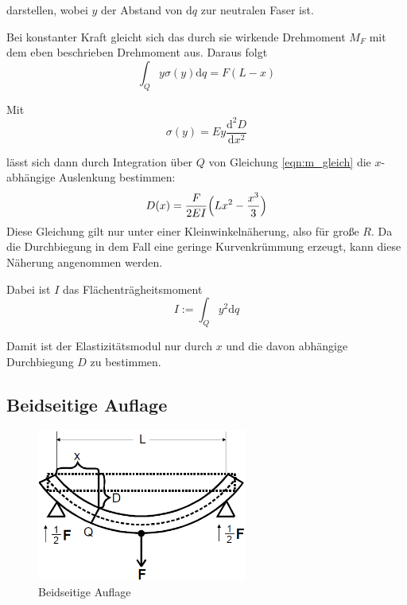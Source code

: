 darstellen, wobei $y$ der Abstand von $\text{d}q$ zur neutralen Faser ist.

Bei konstanter Kraft gleicht sich das durch sie wirkende Drehmoment $M_F$ mit dem eben beschrieben Drehmoment aus. Daraus folgt \begin{equation}
    \label{eqn:m_gleich}
    \int_Q y\sigma(y)\text{d}q = F (L - x) 
\end{equation}

Mit \begin{equation}
    \sigma (y) = E y \frac{\text{d}^2 D}{\text{d} x^2}
\end{equation}

lässt sich dann durch Integration über $Q$ von Gleichung \eqref{eqn:m_gleich} die $x$- abhängige Auslenkung bestimmen:
\begin{equation}
    D(x) = \frac{F}{2EI} \Bigl( L x^2 - \frac{x^3}3 \Bigr)
    \label{eqn:D1_gleich}
\end{equation}
Diese Gleichung gilt nur unter einer Kleinwinkelnäherung, also  für große $R$. Da die Durchbiegung 
in dem Fall eine geringe Kurvenkrümmung erzeugt, kann diese Näherung angenommen werden.

Dabei ist $I$ das Flächenträgheitsmoment \begin{equation}
    I := \int_Q y^2 \text{d}q
    \label{eqn:I}
\end{equation}

Damit ist der Elastizitätsmodul nur durch $x$ und die davon abhängige Durchbiegung $D$ zu bestimmen.

\subsection{Beidseitige Auflage}
\begin{figure}
    \centering
    \includegraphics[height=5cm]{data/bild_2}
    \caption{Beidseitige Auflage}
    \label{fig:2th}
\end{figure}

\FloatBarrier

